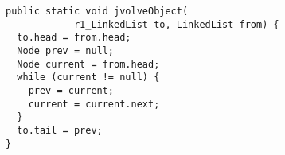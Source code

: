\begin{figure}[t]
\BC
\begin{minipage}{0.8\textwidth}
\begin{lstlisting}[frame=single]
public static void jvolveObject(
            r1_LinkedList to, LinkedList from) {
  to.head = from.head;
  Node prev = null;
  Node current = from.head;
  while (current != null) {
    prev = current;
    current = current.next;
  }
  to.tail = prev;
}
\end{lstlisting}
\end{minipage}
\EC
\VspaceFixForHangcaption
\end{figure}
